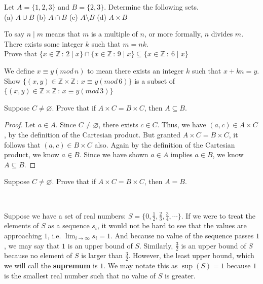 \begin{exercise}
  Let $A = \{1, 2, 3\}$ and $B = \{2, 3\}$.
  Determine the following sets. \\
  (a) $A \cup B$ \quad
  (b) $A \cap B$ \quad
  (c) $A \setminus B$ \quad
  (d) $A \times B$
\end{exercise}
\begin{exercise}
    To say $n\mid m$ means that $m$ is a multiple of $n$, or more formally, $n$ divides $m$. There exists some integer $k$ such that $m=nk$.\\ 
    Prove that $\{x\in\mathbb{Z}\, : \, 2\mid x\}\cap \{x\in\mathbb{Z}\, : \, 9\mid x\}\subseteq \{x\in\mathbb{Z}\ : \ 6\mid x\}$
\end{exercise}
\begin{exercise}
    We define $x\equiv y (mod\, n)$ to mean there exists an integer $k$ such that $x+kn=y$. Show $\{(x,y)\in\mathbb{Z}\times\mathbb{Z}\, : \, x\equiv y (mod\, 6)\}$ is a subset of $\{(x,y)\in\mathbb{Z}\times\mathbb{Z}\, : \, x\equiv y (mod\, 3)\}$
\end{exercise}

\begin{example}
    Suppose $C\neq\varnothing$. Prove that if $A\times C = B\times C$, then $A\subseteq B$. \\
    \begin{proof}
        Let $a\in A$. Since $C\neq\varnothing$, there exists $c\in C$. Thus, we have $(a,c)\in A\times C$, by the definition of the Cartesian product. But granted $A\times C=B\times C$, it follows that $(a,c)\in B\times C$ also. Again by the definition of the Cartesian product, we know $a\in B$. Since we have shown $a\in A$ implies $a\in B$, we know $A\subseteq B$. 
    \end{proof}
\end{example}

\begin{exercise}
    Suppose $C\neq\varnothing$. Prove that if $A\times C = B\times C$, then $A=B$. 
\end{exercise}
\

Suppose we have a set of real numbers: $S=\{0,\frac{1}{2},\frac{2}{3},\frac{3}{4},\cdots\}$. If we were to treat the elements of $S$ as a sequence $s_i$, it would not be hard to see that the values are approaching $1$, i.e. $\lim_{i\to\infty}s_i=1$. And because no value of the sequence passes $1$, we may say that $1$ is an upper bound of $S$. Similarly, $\frac{3}{2}$ is an upper bound of $S$ because no element of $S$ is larger than $\frac{3}{2}$. However, the least upper bound, which we will call the \textbf{supremum} is $1$. We may notate this as $\sup(S)=1$ because $1$ is the smallest real number such that no value of $S$ is greater. \\

